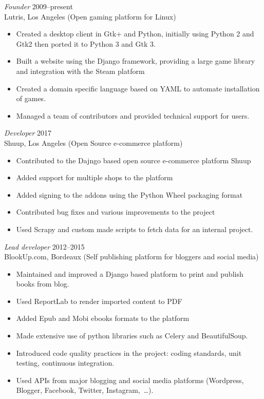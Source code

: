 \documentclass[margin]{res}
\begin{document}
\begin{resume}
{\sl Founder\/} \hfill 2009--present\\
Lutris, Los Angeles (Open gaming platform for Linux)
\begin{itemize} \itemsep -2pt
\item Created a desktop client in Gtk+ and Python, initially using Python 2 and Gtk2 then ported it to Python 3 and Gtk 3.
\item Built a website using the Django framework, providing a large game library and integration with the Steam platform
\item Created a domain specific language based on YAML to automate installation of games.
\item Managed a team of contributors and provided technical support for users.
\end{itemize}

{\sl Developer\/} \hfill 2017\\
Shuup, Los Angeles (Open Source e-commerce platform)
\begin{itemize} \itemsep -2pt
    \item Contributed to the Dajngo based open source e-commerce platform Shuup
    \item Added support for multiple shops to the platform
    \item Added signing to the addons using the Python Wheel packaging format
    \item Contributed bug fixes and various improvements to the project
    \item Used Scrapy and custom made scripts to fetch data for an internal project.
\end{itemize}

{\sl Lead developer\/} \hfill 2012--2015\\
BlookUp.com, Bordeaux (Self publishing platform for bloggers and social media)
\begin{itemize} \itemsep -2pt
    \item Maintained and improved a Django based platform to print and publish books from blog.
    \item Used ReportLab to render imported content to PDF
    \item Added Epub and Mobi ebooks formats to the platform
    \item Made extensive use of python libraries such as Celery and BeautifulSoup.
    \item Introduced code quality practices in the project: coding standards, unit testing, continuous integration.
    \item Used APIs from major blogging and social media platforms (Wordpress, Blogger, Facebook, Twitter, Instagram, …).
\end{itemize}


\end{resume}
\end{document}
